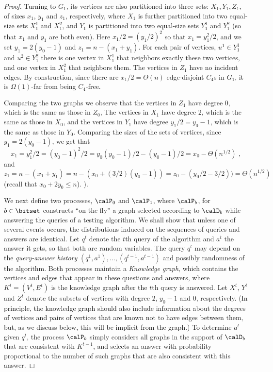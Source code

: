\begin{proof}
Turning to $G_1$, its vertices are also partitioned into three sets: $X_1,Y_1,Z_1$, of sizes $x_1$, $y_1$ and $z_1$, respectively, where $X_1$ is further partitioned into two equal-size sets $X_1^1$ and $X_1^2$, and $Y_1$ is partitioned into two equal-size sets $Y_1^1$ and $Y_1^2$ (so that $x_1$ and $y_1$ are both even).
Here $x_1/2 = (y_1/2)^2$ so that $x_1 = y_1^2/2$, and we set $y_1 = 2(y_0-1)$ and $z_1 = n- (x_1+y_1)$. For each pair of vertices, $u^1 \in Y_1^1$ and $u^2 \in Y_1^2$ there is one vertex in $X_1^1$ that neighbors exactly these two vertices, and one vertex in $X_1^2$ that neighbors them. The vertices in $Z_1$ have
no incident edges. By construction, since there are $x_1/2 = \Theta(n)$ edge-disjoint $C_4$s in $G_1$, it is $\Omega(1)$-far from being $C_4$-free.

Comparing the two graphs we observe that the vertices in
$Z_1$ have degree 0, which is the same as those in $Z_0$, The vertices in $X_1$ have degree 2, which is the same as those in $X_0$, and  the vertices in $Y_1$ have degree $y_1/2 = y_0-1$, which is the same as those in $Y_0$.
Comparing the sizes of the sets of vertices, since $y_1 = 2(y_0-1)$, we get that
$$x_1 = y_1^2/2 = (y_0-1)^2/2 = y_0(y_0-1)/2 - (y_0-1)/2 = x_0 - \Theta(n^{1/2})\;,$$
and
$$z_1 = n-(x_1+y_1) = n - (x_0 + (3/2)(y_0-1)) = z_0 - (y_0/2 - 3/2)) = \Theta(n^{1/2})$$
(recall that $x_0 + 2y_0 \leq n$). ).

We next define two processes, $\calP_0$ and $\calP_1$, where $\calP_b$, for $b\in \bitset$ constructs ``on the fly'' a graph selected  according to $\calD_b$ while answering the queries of a testing algorithm. We shall show that unless one of several events occurs, the distributions induced on the sequences of queries and answers are identical. Let $q^t$ denote the $t$th query of the algorithm and $a^t$ the answer it gets, so that both are random variables. The query $q^t$ may depend on the \emph{query-answer history} $(q^1,a^1),\dots,(q^{t-1},a^{t-1})$ and possibly randomness of the algorithm. Both processes maintain a \emph{Knowledge graph}, which contains the vertices and edges that appear in these questions and answers, where $K^t=(V^t,E^t)$ is the knowledge graph after the $t$th query is answered. Let $X^t$, $Y^t$ and $Z^t$ denote the subsets of vertices with degree $2$, $y_0-1$ and $0$, respectively.
(In principle, the knowledge graph should also include information about the degrees of vertices and pairs of vertices that are known not to have edges between them, but, as we discuss below, this will be implicit from the graph.)
To determine $a^t$ given $q^t$,
the process $\calP_b$ simply considers all graphs in the support of $\calD_b$ that are consistent with $K^{t-1}$, and selects an answer with probability proportional to the number of such graphs that are also consistent with this answer.


\end{proof}
